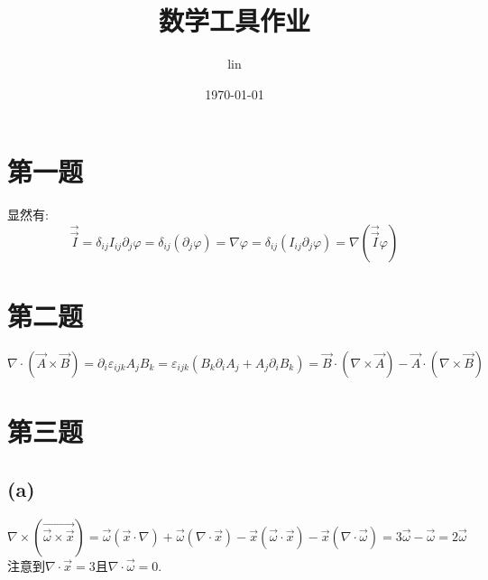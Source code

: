 \documentclass{ctexart}
\title{数学工具作业}
\author{lin}
\date{\today}
\begin{document}
\maketitle
\section{第一题}

显然有:
\begin{equation}
    \vec{\vec{I}}=\delta_{ij}I_{ij}\partial_{j}\varphi=\delta_{ij}(\partial_{j}\varphi)=\nabla\varphi=\delta_{ij}(I_{ij}\partial_{j}\varphi)
    =\nabla(\vec{\vec{I}}\varphi)
\end{equation}
\section{第二题}
\begin{equation}
    \nabla\cdot(\vec{A}\times\vec{B})=\partial_{i}\varepsilon_{ijk}A_{j}B_{k}=\varepsilon_{ijk}(B_{k}\partial_{i}A_{j}+A_{j}\partial_{i}B_{k})=
    \vec{B}\cdot(\nabla\times\vec{A})-\vec{A}\cdot(\nabla\times\vec{B})
\end{equation}
\section{第三题}
\subsection{(a)}
\begin{equation}
    \nabla\times(\vec{\vec{\omega}\times\vec{x}})=\vec{\omega}(\vec{x}\cdot\nabla)+\vec{\omega}(\nabla\cdot\vec{x})-\vec{x}(\vec{\omega}\cdot\vec{x})-\vec{x}(\nabla\cdot\vec{\omega})
    =3\vec{\omega}-\vec{\omega}=2\vec{\omega}
\end{equation}
注意到$\nabla\cdot\vec{x}=3$且$\nabla\cdot\vec{\omega}=0$.
\end{document}
